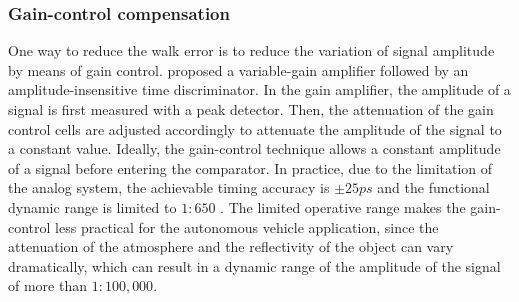 \subsubsection{Gain-control compensation}
One way to reduce the walk error is to reduce the variation of signal amplitude by means of gain control. \cite{ruotsalainen2001wide} proposed a variable-gain amplifier followed by an amplitude-insensitive time discriminator. In the gain amplifier, the amplitude of a signal is first measured with a peak detector. Then, the attenuation of the gain control cells are adjusted accordingly to attenuate the amplitude of the signal to a constant value. Ideally, the gain-control technique allows a constant amplitude of a signal before entering the comparator. In practice, due to the limitation of the analog system, the achievable timing accuracy is $\pm 25 ps$ and the functional dynamic range is limited to $1:650$ \citep{ruotsalainen2001wide}. The limited operative range makes the gain-control less practical for the autonomous vehicle application, since the attenuation of the atmosphere and the reflectivity of the object can vary dramatically, which can result in a dynamic range of the amplitude of the signal of more than $1: 100,000$. 

